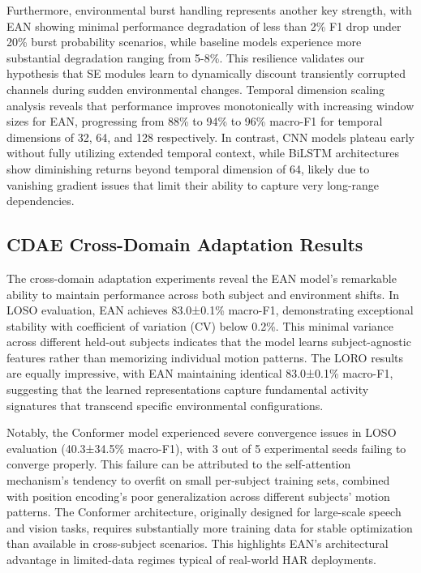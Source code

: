\documentclass[lettersize,journal]{IEEEtran}
\begin{document}
Furthermore, environmental burst handling represents another key strength, with EAN showing minimal performance degradation of less than 2\% F1 drop under 20\% burst probability scenarios, while baseline models experience more substantial degradation ranging from 5-8\%. This resilience validates our hypothesis that SE modules learn to dynamically discount transiently corrupted channels during sudden environmental changes. Temporal dimension scaling analysis reveals that performance improves monotonically with increasing window sizes for EAN, progressing from 88\% to 94\% to 96\% macro-F1 for temporal dimensions of 32, 64, and 128 respectively. In contrast, CNN models plateau early without fully utilizing extended temporal context, while BiLSTM architectures show diminishing returns beyond temporal dimension of 64, likely due to vanishing gradient issues that limit their ability to capture very long-range dependencies.

\subsection{CDAE Cross-Domain Adaptation Results}

The cross-domain adaptation experiments reveal the EAN model's remarkable ability to maintain performance across both subject and environment shifts. In LOSO evaluation, EAN achieves 83.0±0.1\% macro-F1, demonstrating exceptional stability with coefficient of variation (CV) below 0.2\%. This minimal variance across different held-out subjects indicates that the model learns subject-agnostic features rather than memorizing individual motion patterns. The LORO results are equally impressive, with EAN maintaining identical 83.0±0.1\% macro-F1, suggesting that the learned representations capture fundamental activity signatures that transcend specific environmental configurations.

Notably, the Conformer model experienced severe convergence issues in LOSO evaluation (40.3±34.5\% macro-F1), with 3 out of 5 experimental seeds failing to converge properly. This failure can be attributed to the self-attention mechanism's tendency to overfit on small per-subject training sets, combined with position encoding's poor generalization across different subjects' motion patterns. The Conformer architecture, originally designed for large-scale speech and vision tasks, requires substantially more training data for stable optimization than available in cross-subject scenarios. This highlights EAN's architectural advantage in limited-data regimes typical of real-world HAR deployments.
\end{document}
